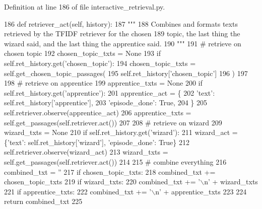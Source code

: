 Definition at line 186 of file interactive\+\_\+retrieval.\+py.


\begin{DoxyCode}
186     \textcolor{keyword}{def }retriever\_act(self, history):
187         \textcolor{stringliteral}{"""}
188 \textcolor{stringliteral}{        Combines and formats texts retrieved by the TFIDF retriever for the chosen}
189 \textcolor{stringliteral}{        topic, the last thing the wizard said, and the last thing the apprentice said.}
190 \textcolor{stringliteral}{        """}
191         \textcolor{comment}{# retrieve on chosen topic}
192         chosen\_topic\_txts = \textcolor{keywordtype}{None}
193         \textcolor{keywordflow}{if} self.ret\_history.get(\textcolor{stringliteral}{'chosen\_topic'}):
194             chosen\_topic\_txts = self.get\_chosen\_topic\_passages(
195                 self.ret\_history[\textcolor{stringliteral}{'chosen\_topic'}]
196             )
197 
198         \textcolor{comment}{# retrieve on apprentice}
199         apprentice\_txts = \textcolor{keywordtype}{None}
200         \textcolor{keywordflow}{if} self.ret\_history.get(\textcolor{stringliteral}{'apprentice'}):
201             apprentice\_act = \{
202                 \textcolor{stringliteral}{'text'}: self.ret\_history[\textcolor{stringliteral}{'apprentice'}],
203                 \textcolor{stringliteral}{'episode\_done'}: \textcolor{keyword}{True},
204             \}
205             self.retriever.observe(apprentice\_act)
206             apprentice\_txts = self.get\_passages(self.retriever.act())
207 
208         \textcolor{comment}{# retrieve on wizard}
209         wizard\_txts = \textcolor{keywordtype}{None}
210         \textcolor{keywordflow}{if} self.ret\_history.get(\textcolor{stringliteral}{'wizard'}):
211             wizard\_act = \{\textcolor{stringliteral}{'text'}: self.ret\_history[\textcolor{stringliteral}{'wizard'}], \textcolor{stringliteral}{'episode\_done'}: \textcolor{keyword}{True}\}
212             self.retriever.observe(wizard\_act)
213             wizard\_txts = self.get\_passages(self.retriever.act())
214 
215         \textcolor{comment}{# combine everything}
216         combined\_txt = \textcolor{stringliteral}{''}
217         \textcolor{keywordflow}{if} chosen\_topic\_txts:
218             combined\_txt += chosen\_topic\_txts
219         \textcolor{keywordflow}{if} wizard\_txts:
220             combined\_txt += \textcolor{stringliteral}{'\(\backslash\)n'} + wizard\_txts
221         \textcolor{keywordflow}{if} apprentice\_txts:
222             combined\_txt += \textcolor{stringliteral}{'\(\backslash\)n'} + apprentice\_txts
223 
224         \textcolor{keywordflow}{return} combined\_txt
225 
\end{DoxyCode}
